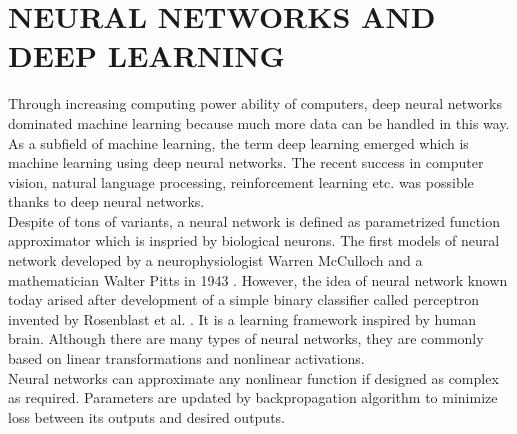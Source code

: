 \chapter{NEURAL NETWORKS AND DEEP LEARNING}
\label{chap:dnns}
Through increasing computing power ability of computers, deep neural networks dominated machine learning because much more data can be handled in this way. As a subfield of machine learning, the term deep learning emerged which is machine learning using deep neural networks. The recent success in computer vision, natural language processing, reinforcement learning etc. was possible thanks to deep neural networks. \\
Despite of tons of variants, a neural network is defined as parametrized function approximator which is inspried by biological neurons. The first models of neural network developed by a neurophysiologist Warren McCulloch and a mathematician Walter Pitts in 1943 \cite{mcculloch_logical_1943}. However, the idea of neural network known today arised after development of a simple binary classifier called perceptron invented by Rosenblast et al. \cite{rosenblatt_perceptron_1958}. It is a learning framework inspired by human brain. Although there are many types of neural networks, they are commonly based on linear transformations and nonlinear activations.\\
Neural networks can approximate any nonlinear function if designed as complex as required. Parameters are updated by backpropagation algorithm to minimize loss between its outputs and desired outputs.
